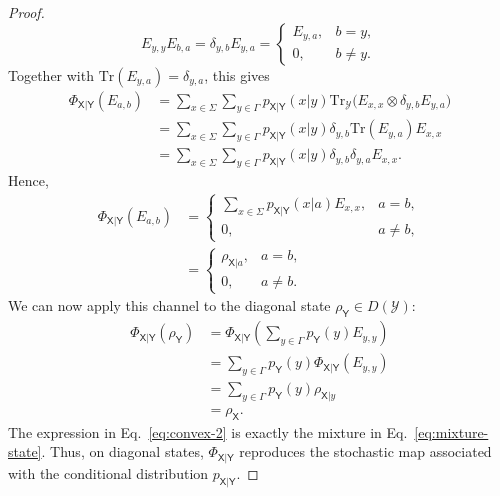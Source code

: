 \documentclass[
    aps,
    pra,
    reprint,
    superscriptaddress,
    nofootinbib
]{revtex4-2}
\theoremstyle{definition}
\theoremstyle{plain}
\begin{document}
\begin{proof}
\begin{equation}
    E_{y,y}E_{b,a}
    =
    \delta_{y,b}E_{y,a}
    =
    \begin{cases}
        E_{y,a}, & b=y,\\
        0, & b\neq y.
    \end{cases}
\end{equation}
Together with
$\mathrm{Tr}(E_{y,a})=\delta_{y,a}$, this gives
\begin{align}
    \Phi_{\mathsf{X}|\mathsf{Y}}(E_{a,b})
    &=
    \sum_{x\in\Sigma}\sum_{y\in\Gamma}
    p_{\mathsf{X}|\mathsf{Y}}(x|y)
    \mathrm{Tr}_{\mathcal{Y}}
    \bigl(
        E_{x,x}\otimes\delta_{y,b}E_{y,a}
    \bigr)\\
    &=
    \sum_{x\in\Sigma}\sum_{y\in\Gamma}
    p_{\mathsf{X}|\mathsf{Y}}(x|y)
    \delta_{y,b}\mathrm{Tr}(E_{y,a})E_{x,x}\\
    &=
    \sum_{x\in\Sigma}\sum_{y\in\Gamma}
    p_{\mathsf{X}|\mathsf{Y}}(x|y)
    \delta_{y,b}\delta_{y,a}E_{x,x}.
\end{align}
Hence,
\begin{align}
    \Phi_{\mathsf{X}|\mathsf{Y}}(E_{a,b})
    &=
    \begin{cases}
        \displaystyle
        \sum_{x\in\Sigma}
        p_{\mathsf{X}|\mathsf{Y}}(x|a)E_{x,x},
        & a=b,\\[0.75em]
        0, & a\neq b,
    \end{cases}\\
    &=
    \begin{cases}
        \rho_{\mathsf{X}|a}, & a=b,\\
        0, & a\neq b.
    \end{cases}
\end{align}
We can now apply this channel to the diagonal state
$\rho_{\mathsf{Y}}\in D(\mathcal{Y})$:
\begin{align}
    \Phi_{\mathsf{X}|\mathsf{Y}}(\rho_{\mathsf{Y}})
    &=
    \Phi_{\mathsf{X}|\mathsf{Y}}
    \left(
        \sum_{y\in\Gamma}p_{\mathsf{Y}}(y)E_{y,y}
    \right)\\
    &=
    \sum_{y\in\Gamma}
    p_{\mathsf{Y}}(y)
    \Phi_{\mathsf{X}|\mathsf{Y}}(E_{y,y})\\
    &=
    \sum_{y\in\Gamma}
    p_{\mathsf{Y}}(y)\rho_{\mathsf{X}|y}
    \label{eq:convex-2}\\
    &=
    \rho_{\mathsf{X}}.
\end{align}
The expression in Eq.~\eqref{eq:convex-2} is exactly the mixture in
Eq.~\eqref{eq:mixture-state}. Thus, on diagonal states,
$\Phi_{\mathsf{X}|\mathsf{Y}}$ reproduces the stochastic map associated
with the conditional distribution $p_{\mathsf{X}|\mathsf{Y}}$.
\end{proof}
\end{document}
